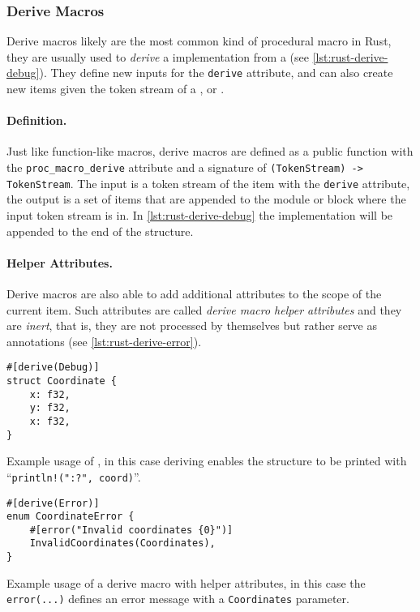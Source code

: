 \subsubsection*{Derive Macros}\label{sec:rust-macros:proc:derive}
Derive macros likely are the most common kind of procedural macro in Rust,
they are usually used to \emph{derive} a  implementation from a  (see \autoref{lst:rust-derive-debug}).
They define new inputs for the \texttt{derive} attribute,
and can also create new items given the token stream of a ,  or .

\paragraph{Definition.}
Just like function-like macros,
derive macros are defined as a public function with the \texttt{proc\_macro\_derive} attribute
and a signature of \texttt{(TokenStream) -> TokenStream}.
The input is a token stream of the item with the \texttt{derive} attribute,
the output is a set of items that are appended to the module or block where the input token stream is in.
In \autoref{lst:rust-derive-debug} the  implementation will be appended to the end of the structure.

\paragraph{Helper Attributes.}
Derive macros are also able to add additional attributes to the scope of the current item.
Such attributes are called \emph{derive macro helper attributes} and they are \emph{inert},
that is, they are not processed by themselves but rather serve as annotations (see \autoref{lst:rust-derive-error}).

\begin{listing}
    \centering
    \begin{verbatim}
#[derive(Debug)]
struct Coordinate {
    x: f32,
    y: f32,
    x: f32,
}
    \end{verbatim}
    \caption{
    Example usage of \keyword{\#[derive(...)]},
    in this case deriving  enables the structure to be printed with
    “\texttt{println!("{:?}", coord)}”.
    }
    \label{lst:rust-derive-debug}
\end{listing}

\begin{listing}
    \centering
    \begin{verbatim}
#[derive(Error)]
enum CoordinateError {
    #[error("Invalid coordinates {0}")]
    InvalidCoordinates(Coordinates),
}
    \end{verbatim}
    \caption{
        Example usage of a derive macro with helper attributes,
        in this case the \texttt{error(...)} defines an error message with a \texttt{Coordinates} parameter.
    }
    \label{lst:rust-derive-error}
\end{listing}

